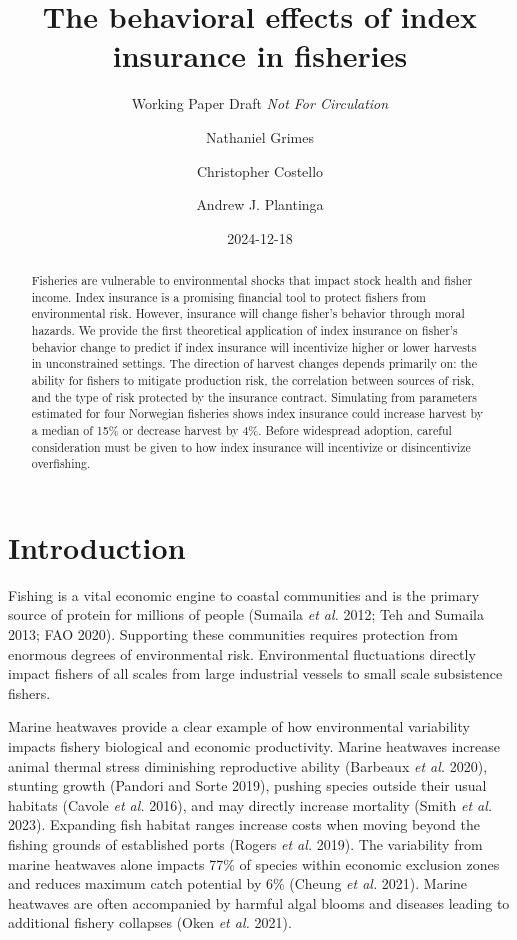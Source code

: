 \documentclass[
  letterpaper,
  DIV=11,
  numbers=noendperiod]{scrartcl}
\title{The behavioral effects of index insurance in fisheries}
\subtitle{Working Paper Draft \emph{Not For Circulation}}
\author{Nathaniel Grimes \and Christopher Costello \and Andrew J.
Plantinga}
\date{2024-12-18}
\renewcommand*\contentsname{Table of contents}
\newcommand\contentsname{Table of contents}
\theoremstyle{plain}
\theoremstyle{plain}
\theoremstyle{remark}
\begin{document}
\maketitle
\begin{abstract}
Fisheries are vulnerable to environmental shocks that impact stock
health and fisher income. Index insurance is a promising financial tool
to protect fishers from environmental risk. However, insurance will
change fisher's behavior through moral hazards. We provide the first
theoretical application of index insurance on fisher's behavior change
to predict if index insurance will incentivize higher or lower harvests
in unconstrained settings. The direction of harvest changes depends
primarily on: the ability for fishers to mitigate production risk, the
correlation between sources of risk, and the type of risk protected by
the insurance contract. Simulating from parameters estimated for four
Norwegian fisheries shows index insurance could increase harvest by a
median of 15\% or decrease harvest by 4\%. Before widespread adoption,
careful consideration must be given to how index insurance will
incentivize or disincentivize overfishing.
\end{abstract}
\ifdefined\Shaded\renewenvironment{Shaded}{\begin{tcolorbox}[interior hidden, borderline west={3pt}{0pt}{shadecolor}, enhanced, breakable, frame hidden, boxrule=0pt, sharp corners]}{\end{tcolorbox}}\fi

\renewcommand*\contentsname{Table of contents}
{
\hypersetup{linkcolor=}
\setcounter{tocdepth}{3}
\tableofcontents
}
\hypertarget{introduction}{%
\section{Introduction}\label{introduction}}

Fishing is a vital economic engine to coastal communities and is the
primary source of protein for millions of people (Sumaila \emph{et al.}
2012; Teh and Sumaila 2013; FAO 2020). Supporting these communities
requires protection from enormous degrees of environmental risk.
Environmental fluctuations directly impact fishers of all scales from
large industrial vessels to small scale subsistence fishers.

Marine heatwaves provide a clear example of how environmental
variability impacts fishery biological and economic productivity. Marine
heatwaves increase animal thermal stress diminishing reproductive
ability (Barbeaux \emph{et al.} 2020), stunting growth (Pandori and
Sorte 2019), pushing species outside their usual habitats (Cavole
\emph{et al.} 2016), and may directly increase mortality (Smith \emph{et
al.} 2023). Expanding fish habitat ranges increase costs when moving
beyond the fishing grounds of established ports (Rogers \emph{et al.}
2019). The variability from marine heatwaves alone impacts 77\% of
species within economic exclusion zones and reduces maximum catch
potential by 6\% (Cheung \emph{et al.} 2021). Marine heatwaves are often
accompanied by harmful algal blooms and diseases leading to additional
fishery collapses (Oken \emph{et al.} 2021).
\end{document}
